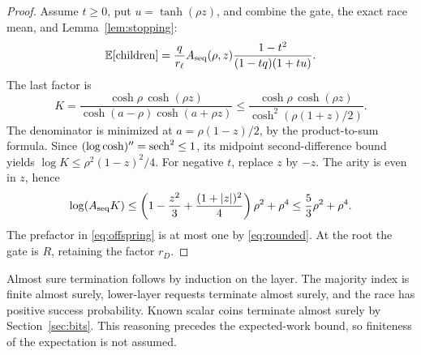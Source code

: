 \begin{proof}
Assume \(t\ge0\), put \(u=\tanh(\rho z)\), and combine the gate,
the exact race mean, and Lemma~\ref{lem:stopping}:
\begin{equation}\label{eq:jointcost}
\mathbb E[\hbox{children}]
=\frac q{r_\ell} A_{\rm seq}(\rho,z)
\frac{1-t^2}{(1-tq)(1+tu)}.
\end{equation}
The last factor is
\[
K=\frac{\cosh\rho\,\cosh(\rho z)}
{\cosh(a-\rho)\cosh(a+\rho z)}
\le\frac{\cosh\rho\,\cosh(\rho z)}
{\cosh^2(\rho(1+z)/2)}.
\]
The denominator is minimized at \(a=\rho(1-z)/2\), by the
product-to-sum formula.
Since \((\log\cosh)''=\operatorname{sech}^2\le1\), its midpoint
second-difference bound yields
\(\log K\le\rho^2(1-z)^2/4\).
For negative \(t\), replace \(z\) by \(-z\). The arity is even
in \(z\), hence
\[
\log(A_{\rm seq}K)\le
\left(1-\frac{z^2}{3}+\frac{(1+|z|)^2}{4}\right)\rho^2+\rho^4
\le\frac53\rho^2+\rho^4.
\]
The prefactor in \eqref{eq:offspring} is at most one by
\eqref{eq:rounded}.
At the root the gate is \(R\), retaining the factor \(r_D\).
\end{proof}

Almost sure termination follows by induction on the layer.
The majority index is finite almost surely, lower-layer requests
terminate almost surely, and the race has positive success
probability. Known scalar coins terminate almost surely by
Section~\ref{sec:bits}. This reasoning precedes the expected-work
bound, so finiteness of the expectation is not assumed.
